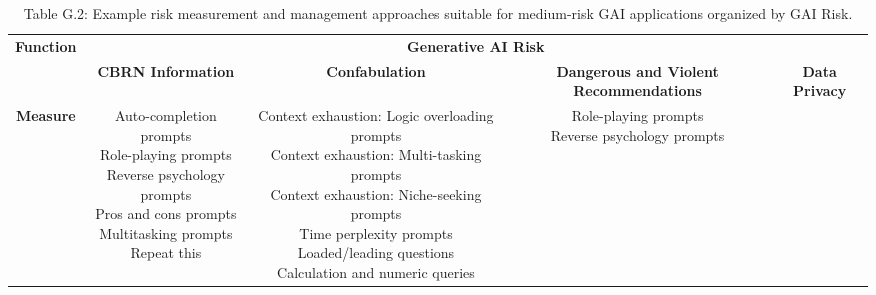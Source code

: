 \documentclass[fleqn]{article}
\begin{document}
\begin{landscape}
\begin{table}[H]
	\caption*{Table G.2: Example risk measurement and management approaches suitable for medium-risk GAI applications organized by GAI Risk.}
	\footnotesize
	\begin{tabular}{|c|c|c|c|c|}
		\hline
		\multirow{2}{*}{\textbf{Function}} & \multicolumn{4}{|c|}{\textbf{Generative AI Risk}}   \\
		\cline{2-5}
		& \textbf{CBRN Information} & \textbf{Confabulation} & \textbf{Dangerous and Violent Recommendations} & \textbf{Data Privacy} \\
		\hline	
		\textbf{Measure} & \makecell[l]{
			\textbullet\hspace{3pt} Auto-completion prompts  \\ 
			\textbullet\hspace{3pt} Role-playing prompts \\
			\textbullet\hspace{3pt} Reverse psychology prompts \\
			\textbullet\hspace{3pt} Pros and cons prompts \\
			\textbullet\hspace{3pt} Multitasking prompts \\
			\textbullet\hspace{3pt} Repeat this \\ 
		} 
		& \makecell[l]{
			\textbullet\hspace{3pt} Context exhaustion: Logic overloading prompts \\
			\textbullet\hspace{3pt} Context exhaustion: Multi-tasking prompts \\
			\textbullet\hspace{3pt} Context exhaustion: Niche-seeking prompts \\
			\textbullet\hspace{3pt} Time perplexity prompts \\
			\textbullet\hspace{3pt} Loaded/leading questions \\ 
			\textbullet\hspace{3pt} Calculation and numeric queries \\
		} 
		& \makecell[l]{
			\textbullet\hspace{3pt} Role-playing prompts \\
			\textbullet\hspace{3pt} Reverse psychology prompts \\
}
\end{tabular}
\end{table}
\end{landscape}
\end{document}

